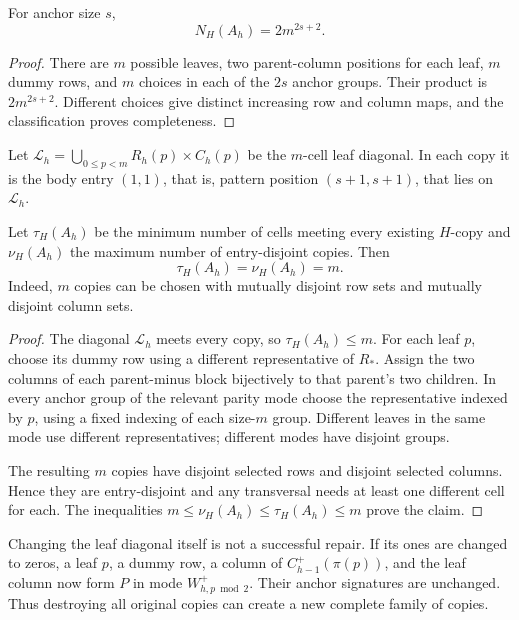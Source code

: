 \begin{corollary}
\label{cor:exact-count}
For anchor size \(s\),
\begin{equation}
 N_H(A_h)=2m^{2s+2}.
 \label{eq:exact-general-count}
\end{equation}
\end{corollary}
\begin{proof}
There are \(m\) possible leaves, two parent-column positions for each
leaf, \(m\) dummy rows, and \(m\) choices in each of the \(2s\) anchor
groups. Their product is \(2m^{2s+2}\). Different choices give distinct
increasing row and column maps, and the classification proves completeness.
\end{proof}

Let \(\mathcal L_h=\bigcup_{0\le p<m}R_h(p)\times C_h(p)\) be the
\(m\)-cell leaf diagonal. In each copy it is the body entry \((1,1)\),
that is, pattern position \((s+1,s+1)\), that lies on \(\mathcal L_h\).

\begin{theorem}
\label{thm:packing}
Let \(\tau_H(A_h)\) be the minimum number of cells meeting every existing
\(H\)-copy and \(\nu_H(A_h)\) the maximum number of entry-disjoint copies.
Then
\begin{equation}
 \tau_H(A_h)=\nu_H(A_h)=m.
 \label{eq:packing}
\end{equation}
Indeed, \(m\) copies can be chosen with mutually disjoint row sets and
mutually disjoint column sets.
\end{theorem}
\begin{proof}
The diagonal \(\mathcal L_h\) meets every copy, so \(\tau_H(A_h)\le m\).
For each leaf \(p\), choose its dummy row using a different representative
of \(R_*\). Assign the two columns of each parent-minus block bijectively
to that parent's two children. In every anchor group of the relevant
parity mode choose the representative indexed by \(p\), using a fixed
indexing of each size-\(m\) group. Different leaves in the same mode use
different representatives; different modes have disjoint groups.

The resulting \(m\) copies have disjoint selected rows and disjoint
selected columns. Hence they are entry-disjoint and any transversal
needs at least one different cell for each. The inequalities
\(m\le\nu_H(A_h)\le\tau_H(A_h)\le m\) prove the claim.
\end{proof}

Changing the leaf diagonal itself is not a successful repair. If its
ones are changed to zeros, a leaf \(p\), a dummy row, a column of
\(C_{h-1}^+(\pi(p))\), and the leaf column now form \(P\) in mode
\(W_{h,p\bmod2}^+\). Their anchor signatures are unchanged. Thus
destroying all original copies can create a new complete family of copies.

